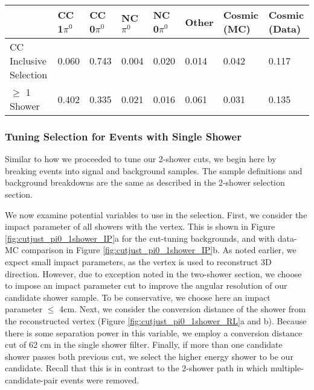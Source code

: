 \begin{table}[H]
\centering
{}
 \begin{tabular}{| l | l | l |l|l|l|l|l|}
 \hline
 & CC 1$\pi^0$ & CC 0$\pi^0$ & NC $\pi^0$ & NC 0$\pi^0$ & Other & Cosmic (MC) & Cosmic (Data) \\ [0.1ex] \hline
CC Inclusive Selection & 0.060 & 0.743 & 0.004 & 0.020 & 0.014 & 0.042 & 0.117 \\
$\geq$ 1 Shower & 0.402 & 0.335 & 0.021 & 0.016 & 0.061 & 0.031 & 0.135\\ \hline
\end{tabular}
\end{table}

\subsubsection{Tuning Selection for Events with Single Shower}

Similar to how we proceeded to tune our 2-shower cuts, we begin here by breaking events into signal and background samples.  The sample definitions and background breakdowns are the same as described in the 2-shower selection section.

\par We now examine potential variables to use in the selection.  First, we consider the impact parameter of all showers with the vertex.  This is shown in Figure \ref{fig:cutjust_pi0_1shower_IP}a for the cut-tuning backgrounds, and with data-MC comparison in Figure \ref{fig:cutjust_pi0_1shower_IP}b. As noted earlier, we expect small impact parameters, as the vertex is used to reconstruct 3D direction. However, due to exception noted in the two-shower section, we choose to impose an impact parameter cut to improve the angular resolution of our candidate shower sample. To be conservative, we choose here an impact parameter $\leq$ 4cm. Next, we consider the conversion distance of the shower from the reconstructed vertex (Figure \ref{fig:cutjust_pi0_1shower_RL}a and b). Because there is some separation power in this variable, we employ a conversion distance cut of 62 cm in the single shower filter. Finally, if more than one candidate shower passes both previous cut, we select the higher energy shower to be our candidate.  Recall that this is in contrast to the 2-shower path in which multiple-candidate-pair events were removed.

